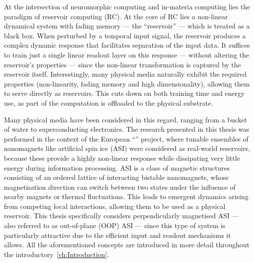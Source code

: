 At the intersection of neuromorphic computing and in-materia computing lies the paradigm of reservoir computing (RC).
At the core of RC lies a non-linear dynamical system with fading memory --- the ``reservoir'' --- which is treated as a black box.
When perturbed by a temporal input signal, the reservoir produces a complex dynamic response that facilitates separation of the input data.
It suffices to train just a single linear readout layer on this response --- without altering the reservoir's properties --- since the non-linear transformation is captured by the reservoir itself.
Interestingly, many physical media naturally exhibit the required properties (non-linearity, fading memory and high dimensionality), allowing them to serve directly as reservoirs.
This cuts down on both training time and energy use, as part of the computation is offloaded to the physical substrate. \par
Many physical media have been considered in this regard, ranging from a bucket of water to superconducting electronics. %
The research presented in this thesis was performed in the context of the European ``\spinengine'' project, where tunable ensembles of nanomagnets like artificial spin ice (ASI) were considered as real-world reservoirs, because these provide a highly non-linear response while dissipating very little energy during information processing.
ASI is a class of magnetic structures consisting of an ordered lattice of interacting bistable nanomagnets, whose magnetisation direction can switch between two states under the influence of nearby magnets or thermal fluctuations.
This leads to emergent dynamics arising from competing local interactions, allowing them to be used as a physical reservoir.
This thesis specifically considers perpendicularly magnetised ASI --- also referred to as out-of-plane (OOP) ASI --- since this type of system is particularly attractive due to the efficient input and readout mechanisms it allows.
All the aforementioned concepts are introduced in more detail throughout the introductory~\cref{ch:Introduction}. \\

